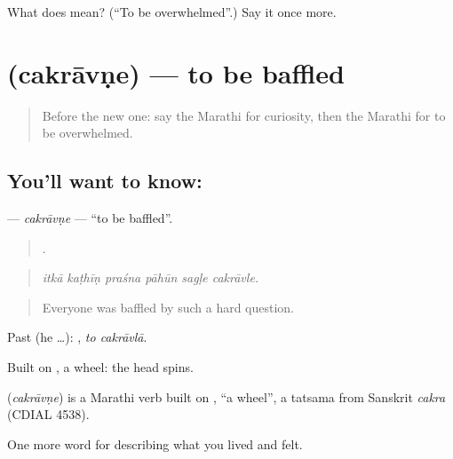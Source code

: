 \begin{tcolorbox}[breakable,colback=teal!4,colframe=teal!35!black,title={Before you move on}]
What does  mean? (\textquotedblleft{}To be overwhelmed\textquotedblright{}.) Say it once more.
\end{tcolorbox}
\section[\texorpdfstring{\mr{चक्रावणे} (cakrāvṇe)}{चक्रावणे (cakrāvṇe)}]{ (cakrāvṇe) — to be baffled}

\label{lesson:MR-C465-cakravne}



\begin{quote}
Before the new one: say the Marathi for curiosity, then the Marathi for to be overwhelmed.
\end{quote}

\subsection*{You'll want to know: }
\textbf{} — \emph{cakrāvṇe} — \textquotedblleft{}to be baffled\textquotedblright{}.

\begin{quote}
     .
\end{quote}

\begin{quote}
\emph{itkā kaṭhīṇ praśna pāhūn sagḷe cakrāvle.}
\end{quote}

\begin{quote}
Everyone was baffled by such a hard question.
\end{quote}

Past (he …):  , \emph{to cakrāvlā}.

Built on , a wheel: the head spins.

\begin{cousinweb}
\textbf{} (\emph{cakrāvṇe}) is a Marathi verb built on , \textquotedblleft{}a wheel\textquotedblright{}, a tatsama from Sanskrit \emph{cakra} (CDIAL 4538).
\end{cousinweb}

\begin{grammarlens}[title={What you've built}]
One more word for describing what you lived and felt.
\end{grammarlens}

